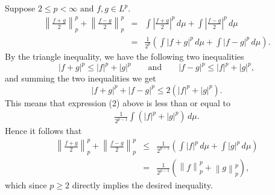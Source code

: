 \documentclass[12pt]{article}
\begin{document}
Suppose $2 \leq p < \infty \textrm{ and } f,g \in L^p$.\\
\begin{eqnarray}
\left\| \frac{f+g}{2} \right\|_p^p + \left\| \frac{f-g}{2} \right\|_p^p
     & = &
\int \left| \frac{f+g}{2} \right|^p \,d\mu + \int \left| \frac{f-g}{2} \right|^p \,d\mu \\
     & = & 
\frac{1}{2^p} \left( \int \left| f+g \right|^p \, d\mu + \int \left| f-g \right|^p \,d\mu \right).
\end{eqnarray}
By the triangle inequality, we have the following two inequalities
$$|f+g|^p\le |f|^p+|g|^p\qquad\mbox{and}\qquad |f-g|^p\le |f|^p+|g|^p,$$ and summing the two inequalities we get
$$|f+g|^p+|f-g|^p\le 2(|f|^p+|g|^p).$$
This means that expression (2) above is less than or equal to 
\begin{eqnarray}
\frac{1}{2^{p-1}}\int (|f|^p + |g|^p) \,d\mu.
\end{eqnarray}
Hence it follows that
\begin{eqnarray*}
\left\| \frac{f+g}{2} \right\|_p^p + \left\| \frac{f-g}{2} \right\|_p^p
   & \le &
\frac{1}{2^{p-1}}\left(\int |f|^p \,d \mu + \int |g|^p \,d\mu \right) \\
   & = &
\frac{1}{2^{p-1}} \left( \left\| f \right\|_p^p + \left\| g \right\|_p^p \right),
\end{eqnarray*}
which since $p\ge 2$ directly implies the desired inequality.
\end{document}
